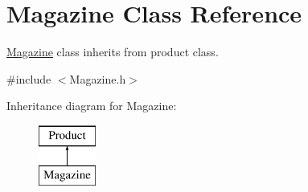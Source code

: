 \hypertarget{classMagazine}{}\section{Magazine Class Reference}
\label{classMagazine}


\hyperlink{classMagazine}{Magazine} class inherits from product class.  




{\ttfamily \#include $<$Magazine.\+h$>$}

Inheritance diagram for Magazine\+:\begin{figure}[H]
\begin{center}
\leavevmode
\includegraphics[height=2.000000cm]{classMagazine}
\end{center}
\end{figure}
